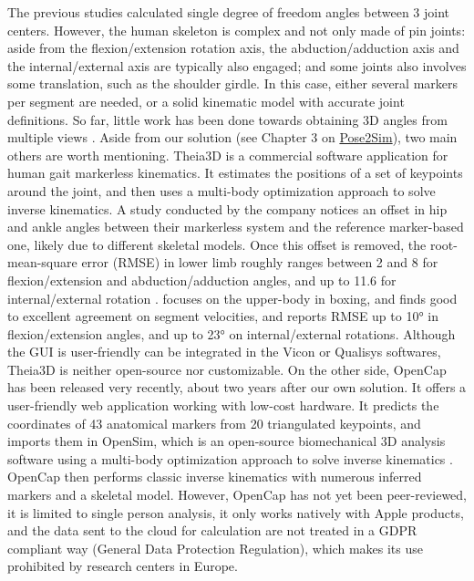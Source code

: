 The previous studies calculated single degree of freedom angles between 3 joint centers. However, the human skeleton is complex and not only made of pin joints: aside from the flexion/extension rotation axis, the abduction/adduction axis and the internal/external axis are typically also engaged; and some joints also involves some translation, such as the shoulder girdle. In this case, either several markers per segment are needed, or a solid kinematic model with accurate joint definitions. So far, little work has been done towards obtaining 3D angles from multiple views \cite{Zheng2022}. Aside from our solution (see Chapter 3 on \hyperref[ch:3]{Pose2Sim}), two main others are worth mentioning. Theia3D is a commercial software application for human gait markerless kinematics. It estimates the positions of a set of keypoints around the joint, and then uses a multi-body optimization approach to solve inverse kinematics. A study conducted by the company notices an offset in hip and ankle angles between their markerless system and the reference marker-based one, likely due to different skeletal models. Once this offset is removed, the root-mean-square error (RMSE) in lower limb roughly ranges between 2 and 8\degree{} for flexion/extension and abduction/adduction angles, and up to 11.6\degree{} for internal/external rotation \cite{Kanko2021b}. \cite{Lahkar2022b} focuses on the upper-body in boxing, and finds good to excellent agreement on segment velocities, and reports RMSE up to 10° in  flexion/extension angles, and up to 23° on internal/external rotations. Although the GUI is user-friendly can be integrated in the Vicon or Qualisys softwares, Theia3D is neither open-source nor customizable. On the other side, OpenCap \cite{Uhlrich2022} has been released very recently, about two years after our own solution. It offers a user-friendly web application working with low-cost hardware. It predicts the coordinates of 43 anatomical markers from 20 triangulated keypoints, and imports them in OpenSim, which is an open-source biomechanical 3D analysis software using a multi-body optimization approach to solve inverse kinematics \cite{Delp2007,Seth2018}. OpenCap then performs classic inverse kinematics with numerous inferred markers and a skeletal model. However, OpenCap has not yet been peer-reviewed, it is limited to single person analysis, it only works natively with Apple products, and the data sent to the cloud for calculation are not treated in a GDPR compliant way (General Data Protection Regulation), which makes its use prohibited by research centers in Europe.

